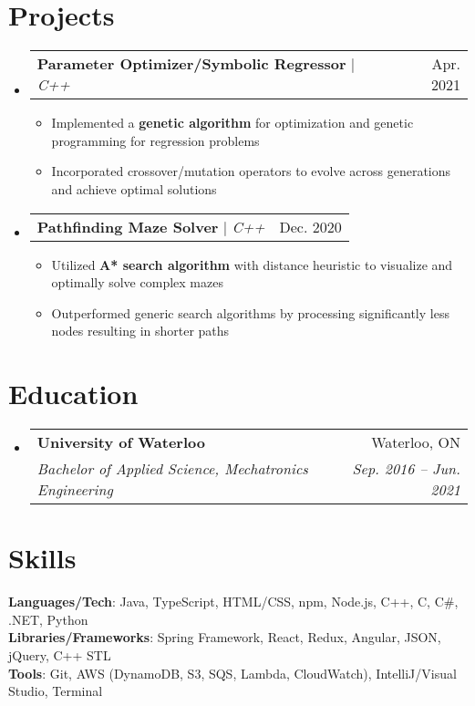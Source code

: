 \documentclass[letterpaper,11pt]{article}
\makeatletter
\newcommand{\resumeItem}[1]{
  \item\small{
    {#1 \vspace{-2pt}}
  }
}
\newcommand{\resumeSubheading}[4]{
  \vspace{-2pt}\item
    \begin{tabular*}{0.97\textwidth}[t]{l@{\extracolsep{\fill}}r}
      \textbf{#1} & #2 \\
      \textit{\small#3} & \textit{\small #4} \\
    \end{tabular*}\vspace{-7pt}
}
\newcommand{\resumeProjectHeading}[2]{
    \item
    \begin{tabular*}{0.97\textwidth}{l@{\extracolsep{\fill}}r}
      \small#1 & #2 \\
    \end{tabular*}\vspace{-7pt}
}
\newcommand{\resumeSubHeadingListStart}{\begin{itemize}[leftmargin=0.15in, label={}]}
\newcommand{\resumeSubHeadingListEnd}{\end{itemize}}
\newcommand{\resumeItemListStart}{\begin{itemize}}
\newcommand{\resumeItemListEnd}{\end{itemize}\vspace{-5pt}}
\makeatother
\begin{document}
\section{Projects}
    \resumeSubHeadingListStart
      \resumeProjectHeading
          {\textbf{Parameter Optimizer/Symbolic Regressor} $|$ \emph{C++}}{Apr. 2021}
          \resumeItemListStart
            \resumeItem{Implemented a \textbf{genetic algorithm} for optimization and genetic programming for regression problems}
            \resumeItem{Incorporated crossover/mutation operators to evolve across generations and achieve optimal solutions}
          \resumeItemListEnd
      \resumeProjectHeading
          {\textbf{Pathfinding Maze Solver} $|$ \emph{C++}}{Dec. 2020}
          \resumeItemListStart
            \resumeItem{Utilized \textbf{A* search algorithm} with distance heuristic to visualize and optimally solve complex mazes}
            \resumeItem{Outperformed generic search algorithms by processing significantly less nodes resulting in shorter paths}
          \resumeItemListEnd
    \resumeSubHeadingListEnd

\section{Education}
  \resumeSubHeadingListStart
    \resumeSubheading
      {University of Waterloo}{Waterloo, ON}
      {Bachelor of Applied Science, Mechatronics Engineering}{Sep. 2016 -- Jun. 2021}
  \resumeSubHeadingListEnd

\section{Skills}
 \begin{itemize}[leftmargin=0.15in, label={}]
    \small{\item{
     \textbf{Languages/Tech}{: Java, TypeScript, HTML/CSS, npm, Node.js, C++, C, C\#, .NET, Python} \\
     \textbf{Libraries/Frameworks}{: Spring Framework, React, Redux, Angular, JSON, jQuery, C++ STL} \\
     \textbf{Tools}{: Git, AWS (DynamoDB, S3, SQS, Lambda, CloudWatch), IntelliJ/Visual Studio, Terminal} \\
    }}
 \end{itemize}

\end{document}

